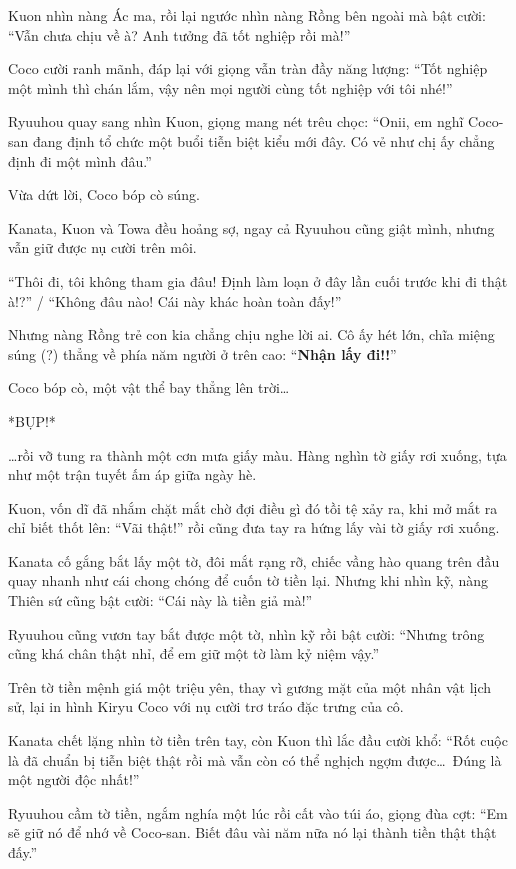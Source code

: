 \documentclass[../main.tex]{subfiles}
\begin{document}
Kuon nhìn nàng Ác ma, rồi lại ngước nhìn nàng Rồng bên ngoài mà bật cười: ``Vẫn chưa chịu về à? Anh tưởng đã tốt nghiệp rồi mà!''

Coco cười ranh mãnh, đáp lại với giọng vẫn tràn đầy năng lượng: ``Tốt nghiệp một mình thì chán lắm, vậy nên mọi người cùng tốt nghiệp với tôi nhé!''

Ryuuhou quay sang nhìn Kuon, giọng mang nét trêu chọc: ``Onii, em nghĩ Coco-san đang định tổ chức một buổi tiễn biệt kiểu mới đây. Có vẻ như chị ấy chẳng định đi một mình đâu.''

Vừa dứt lời, Coco bóp cò súng.

Kanata, Kuon và Towa đều hoảng sợ, ngay cả Ryuuhou cũng giật mình, nhưng vẫn giữ được nụ cười trên môi.

``Thôi đi, tôi không tham gia đâu! Định làm loạn ở đây lần cuối trước khi đi thật à!?'' / ``Không đâu nào! Cái này khác hoàn toàn đấy!''

Nhưng nàng Rồng trẻ con kia chẳng chịu nghe lời ai. Cô ấy hét lớn, chĩa miệng súng (?) thẳng về phía năm người ở trên cao: ``\textbf{Nhận lấy đi!!}''

Coco bóp cò, một vật thể bay thẳng lên trời\dots

*BỤP!*

\dots rồi vỡ tung ra thành một cơn mưa giấy màu. Hàng nghìn tờ giấy rơi xuống, tựa như một trận tuyết ấm áp giữa ngày hè.

Kuon, vốn dĩ đã nhắm chặt mắt chờ đợi điều gì đó tồi tệ xảy ra, khi mở mắt ra chỉ biết thốt lên: ``Vãi thật!'' rồi cũng đưa tay ra hứng lấy vài tờ giấy rơi xuống.

Kanata cố gắng bắt lấy một tờ, đôi mắt rạng rỡ, chiếc vầng hào quang trên đầu quay nhanh như cái chong chóng để cuốn tờ tiền lại. Nhưng khi nhìn kỹ, nàng Thiên sứ cũng bật cười: ``Cái này là tiền giả mà!''

Ryuuhou cũng vươn tay bắt được một tờ, nhìn kỹ rồi bật cười: ``Nhưng trông cũng khá chân thật nhỉ, để em giữ một tờ làm kỷ niệm vậy.''

Trên tờ tiền mệnh giá một triệu yên, thay vì gương mặt của một nhân vật lịch sử, lại in hình Kiryu Coco với nụ cười trơ tráo đặc trưng của cô.


Kanata chết lặng nhìn tờ tiền trên tay, còn Kuon thì lắc đầu cười khổ: ``Rốt cuộc là đã chuẩn bị tiễn biệt thật rồi mà vẫn còn có thể nghịch ngợm được\dots\ Đúng là một người độc nhất!''

Ryuuhou cầm tờ tiền, ngắm nghía một lúc rồi cất vào túi áo, giọng đùa cợt: ``Em sẽ giữ nó để nhớ về Coco-san. Biết đâu vài năm nữa nó lại thành tiền thật thật đấy.''
\end{document}
